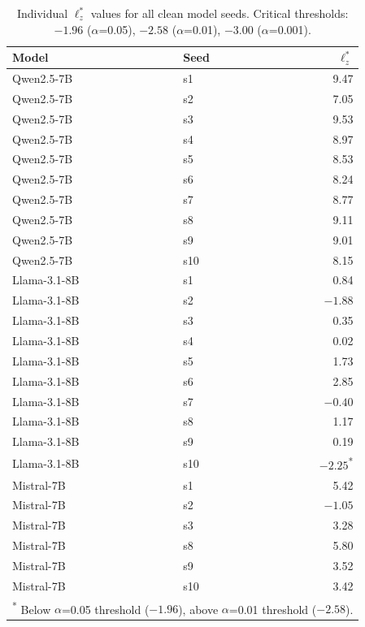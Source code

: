 \begin{table}[h]
\centering
\caption{Individual $\ell_z^*$ values for all clean model seeds. Critical thresholds: $-1.96$ ($\alpha$=0.05), $-2.58$ ($\alpha$=0.01), $-3.00$ ($\alpha$=0.001).}
\label{tab:lz_individual}
\small
\begin{tabular}{llr}
\toprule
Model & Seed & $\ell_z^*$ \\
\midrule
Qwen2.5-7B & s1  & 9.47 \\
Qwen2.5-7B & s2  & 7.05 \\
Qwen2.5-7B & s3  & 9.53 \\
Qwen2.5-7B & s4  & 8.97 \\
Qwen2.5-7B & s5  & 8.53 \\
Qwen2.5-7B & s6  & 8.24 \\
Qwen2.5-7B & s7  & 8.77 \\
Qwen2.5-7B & s8  & 9.11 \\
Qwen2.5-7B & s9  & 9.01 \\
Qwen2.5-7B & s10 & 8.15 \\
\midrule
Llama-3.1-8B & s1  & 0.84 \\
Llama-3.1-8B & s2  & $-1.88$ \\
Llama-3.1-8B & s3  & 0.35 \\
Llama-3.1-8B & s4  & 0.02 \\
Llama-3.1-8B & s5  & 1.73 \\
Llama-3.1-8B & s6  & 2.85 \\
Llama-3.1-8B & s7  & $-0.40$ \\
Llama-3.1-8B & s8  & 1.17 \\
Llama-3.1-8B & s9  & 0.19 \\
Llama-3.1-8B & s10 & $-2.25$\textsuperscript{*} \\
\midrule
Mistral-7B & s1  & 5.42 \\
Mistral-7B & s2  & $-1.05$ \\
Mistral-7B & s3  & 3.28 \\
Mistral-7B & s8  & 5.80 \\
Mistral-7B & s9  & 3.52 \\
Mistral-7B & s10 & 3.42 \\
\bottomrule
\multicolumn{3}{l}{\textsuperscript{*} Below $\alpha$=0.05 threshold ($-1.96$), above $\alpha$=0.01 threshold ($-2.58$).}
\end{tabular}
\end{table}

